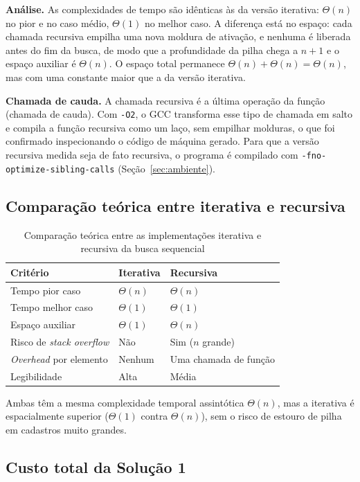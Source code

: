 \documentclass[11pt,a4paper]{article}
\begin{document}
\textbf{Análise.} As complexidades de tempo são idênticas às da versão iterativa: $\Theta(n)$ no pior e no caso médio, $\Theta(1)$ no melhor caso. A diferença está no espaço: cada chamada recursiva empilha uma nova moldura de ativação, e nenhuma é liberada antes do fim da busca, de modo que a profundidade da pilha chega a $n+1$ e o espaço auxiliar é $\Theta(n)$. O espaço total permanece $\Theta(n)+\Theta(n)=\Theta(n)$, mas com uma constante maior que a da versão iterativa.

\textbf{Chamada de cauda.} A chamada recursiva é a última operação da função (chamada de cauda). Com \texttt{-O2}, o GCC transforma esse tipo de chamada em salto e compila a função recursiva como um laço, sem empilhar molduras, o que foi confirmado inspecionando o código de máquina gerado. Para que a versão recursiva medida seja de fato recursiva, o programa é compilado com \texttt{-fno-optimize-sibling-calls} (Seção~\ref{sec:ambiente}).

\subsection{Comparação teórica entre iterativa e recursiva}

\begin{table}[H]
\centering
\caption{Comparação teórica entre as implementações iterativa e recursiva da busca sequencial}
\begin{tabular}{lll}
\toprule
Critério & Iterativa & Recursiva \\
\midrule
Tempo pior caso & $\Theta(n)$ & $\Theta(n)$ \\
Tempo melhor caso & $\Theta(1)$ & $\Theta(1)$ \\
Espaço auxiliar & $\Theta(1)$ & $\Theta(n)$ \\
Risco de \emph{stack overflow} & Não & Sim ($n$ grande) \\
\emph{Overhead} por elemento & Nenhum & Uma chamada de função \\
Legibilidade & Alta & Média \\
\bottomrule
\end{tabular}
\end{table}

Ambas têm a mesma complexidade temporal assintótica $\Theta(n)$, mas a iterativa é espacialmente superior ($\Theta(1)$ contra $\Theta(n)$), sem o risco de estouro de pilha em cadastros muito grandes.

\subsection{Custo total da Solução 1}
\end{document}

